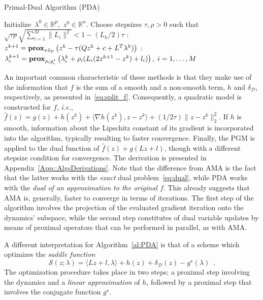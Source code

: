 \documentclass[openany]{now}
\newcommand{\ie}{{\it i.e.}}
\newcommand{\reals}{{\mathbb R}}
\newcommand{\prox}{\mathop{\bf prox}}
\begin{document}
\begin{algorithm}[H]
\caption{Primal-Dual Algorithm (PDA)}
\label{al:PDA}
\begin{algorithmic} 
\REQUIRE \mbox{Initialize $\lambda^{0}\in \reals^{p}$, $z^0\in\reals^n$.} Choose stepsizes \mbox{$\tau,\rho > 0$} such that 
$\sqrt{\tau\rho}\sqrt{\sum_{i=1}^{M}\|L_i\|^2}<1-(L_h/2)\tau$
\LOOP
  : $z^{k+1} = \prox_{\tau\delta_\mathcal{D}}\left(z^k-\tau (Qz^k+c+L^T\lambda^k)\right)$
  : $\lambda_i^{k+1} = \prox_{\rho_i g_i^\star}\left(\lambda_i^k+\rho_i(L_i(2z^{k+1}-z^k)+l_i)\right), \; i=1,\ldots,M$
\ENDLOOP
\end{algorithmic}
\end{algorithm}\begin{footnotesize}
\end{footnotesize}
An important common characteristic of these methods is that they make use of the information that $f$ is the sum of a smooth and a non-smooth term, $h$ and $\delta_\mathcal{D}$, respectively, as presented in~\eqref{eq:split_f}. Consequently, a quadratic model is constructed for $f$, \ie, $\hat{f}(z)=g(z)+h(z^k)+\langle\nabla h(z^k),z-z^k\rangle+(1/2\tau)\|z-z^k\|^2_2$. If $h$ is smooth, information about the Lipschitz constant of its gradient is incorporated into the algorithm, typically resulting to faster convergence.
Finally, the PGM is applied to the dual function of $\hat{f}(z)+g(Lz+l)$, though with a different stepsize condition for convergence. The derivation is presented in Appendix~\ref{App::AlgsDerivations}. Note that the difference from AMA is the fact that the latter works with the \emph{exact} dual problem~\eqref{eq:dual}, while PDA works with the \emph{dual of an approximation to the original $f$}. This already suggests that AMA is, generally, faster to converge in terms of iterations. The first step of the algorithm involves the projection of the evaluated gradient iteration onto the dynamics' subspace, while the second step constitutes of dual variable updates by means of proximal operators that can be performed in parallel, as with AMA. 

A different interpretation for Algorithm~\ref{al:PDA} is that of a scheme which optimizes the \emph{saddle function}
\begin{equation}
\label{eq:S} \tag{S}
\mathcal{S}(z;\lambda) = \langle Lz + l,\lambda\rangle  + h(z) + \delta_\mathcal{D}(z )- g^{\star}(\lambda)\enspace.
\end{equation}
The optimization procedure takes place in two steps; a proximal step involving the dynamics and a \emph{linear approximation} of $h$, followed by a proximal step that involves the conjugate function $g^\star$.
\end{document}
